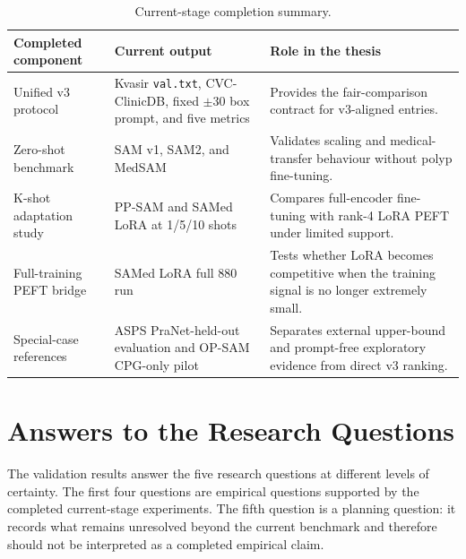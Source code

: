 \begin{table}[H]
\centering
\caption{Current-stage completion summary.}
\label{tab:current-stage-completion}
\begin{tabular}{p{3.2cm}p{5.3cm}p{5.2cm}}
\toprule
\textbf{Completed component} & \textbf{Current output} & \textbf{Role in the thesis} \\
\midrule
Unified v3 protocol & Kvasir \texttt{val.txt}, CVC-ClinicDB, fixed $\pm30$ box prompt, and five metrics & Provides the fair-comparison contract for v3-aligned entries. \\
Zero-shot benchmark & SAM v1, SAM2, and MedSAM & Validates scaling and medical-transfer behaviour without polyp fine-tuning. \\
K-shot adaptation study & PP-SAM and SAMed LoRA at 1/5/10 shots & Compares full-encoder fine-tuning with rank-4 LoRA PEFT under limited support. \\
Full-training PEFT bridge & SAMed LoRA full 880 run & Tests whether LoRA becomes competitive when the training signal is no longer extremely small. \\
Special-case references & ASPS PraNet-held-out evaluation and OP-SAM CPG-only pilot & Separates external upper-bound and prompt-free exploratory evidence from direct v3 ranking. \\
\bottomrule
\end{tabular}
\end{table}

\section{Answers to the Research Questions}
\label{sec:answers-rqs}

The validation results answer the five research questions at different levels of certainty. The first four questions are empirical questions supported by the completed current-stage experiments. The fifth question is a planning question: it records what remains unresolved beyond the current benchmark and therefore should not be interpreted as a completed empirical claim.

